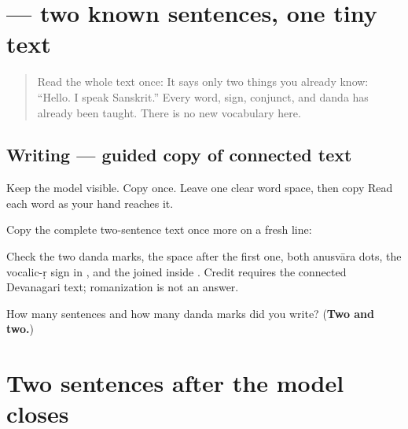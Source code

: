 \section[\texorpdfstring{\sk{नमस्ते।} \sk{अहं} \sk{संस्कृतं} … (namaste. ahaṁ …)}{नमस्ते। अहं संस्कृतं … (namaste. ahaṁ …)}]{    — two known sentences, one tiny text}

\label{lesson:SA-W65-connected-text-guided-copy}



\begin{quote}
Read the whole text once: \textbf{   } It says only two things you already know: “Hello. I speak Sanskrit.” Every word, sign, conjunct, and danda has already been taught. There is no new vocabulary here.
\end{quote}

\subsection*{Writing — guided copy of connected text}
Keep the model visible. Copy \textbf{} once. Leave one clear word space, then copy \textbf{  } Read each word as your hand reaches it.

Copy the complete two-sentence text once more on a fresh line:

\begin{quote}
\textbf{   }
\end{quote}

Check the two danda marks, the space after the first one, both anusvāra dots, the vocalic-ṛ sign in \textbf{}, and the joined \textbf{} inside \textbf{}. Credit requires the connected Devanagari text; romanization is not an answer.

\begin{tcolorbox}[breakable,colback=teal!4,colframe=teal!35!black,title={Before you move on}]
How many sentences and how many danda marks did you write? (\textbf{Two and two.})
\end{tcolorbox}
\section[\texorpdfstring{\sk{नमस्ते।} \sk{अहं} \sk{संस्कृतं} … (namaste. ahaṁ …)}{नमस्ते। अहं संस्कृतं … (namaste. ahaṁ …)}]{Two sentences after the model closes}

